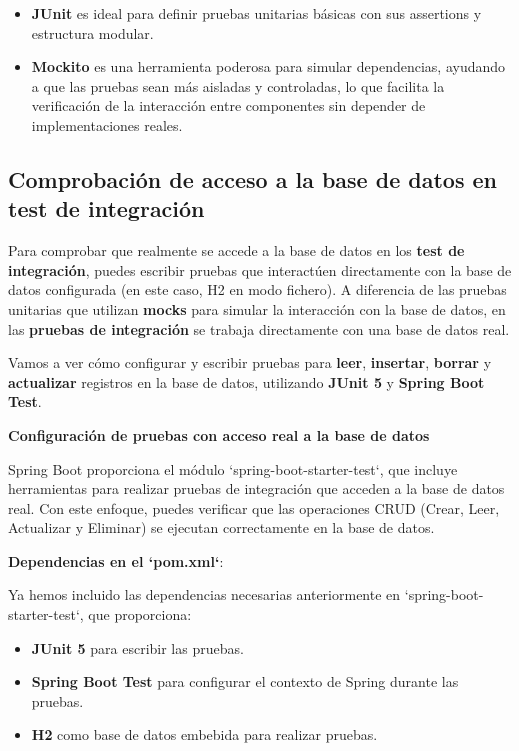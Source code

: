 \documentclass[11pt]{article}
\begin{document}
\begin{itemize}
\item \textbf{\textbf{JUnit}} es ideal para definir pruebas unitarias básicas con sus assertions y estructura modular.
\item \textbf{\textbf{Mockito}} es una herramienta poderosa para simular dependencias, ayudando a que las pruebas sean más aisladas y controladas, lo que facilita la verificación de la interacción entre componentes sin depender de implementaciones reales.
\end{itemize}




\subsection{Comprobación de acceso a la base de datos en test de integración}
\label{sec:orgf8078a7}
Para comprobar que realmente se accede a la base de datos en los \textbf{\textbf{test de integración}}, puedes escribir pruebas que interactúen directamente con la base de datos configurada (en este caso, H2 en modo fichero). A diferencia de las pruebas unitarias que utilizan \textbf{\textbf{mocks}} para simular la interacción con la base de datos, en las \textbf{\textbf{pruebas de integración}} se trabaja directamente con una base de datos real.

Vamos a ver cómo configurar y escribir pruebas para \textbf{\textbf{leer}}, \textbf{\textbf{insertar}}, \textbf{\textbf{borrar}} y \textbf{\textbf{actualizar}} registros en la base de datos, utilizando \textbf{\textbf{JUnit 5}} y \textbf{\textbf{Spring Boot Test}}.

\textbf{\textbf{Configuración de pruebas con acceso real a la base de datos}}

Spring Boot proporciona el módulo `spring-boot-starter-test`, que incluye herramientas para realizar pruebas de integración que acceden a la base de datos real. Con este enfoque, puedes verificar que las operaciones CRUD (Crear, Leer, Actualizar y Eliminar) se ejecutan correctamente en la base de datos.

\textbf{\textbf{Dependencias en el `pom.xml`}}:

Ya hemos incluido las dependencias necesarias anteriormente en `spring-boot-starter-test`, que proporciona:
\begin{itemize}
\item \textbf{\textbf{JUnit 5}} para escribir las pruebas.
\item \textbf{\textbf{Spring Boot Test}} para configurar el contexto de Spring durante las pruebas.
\item \textbf{\textbf{H2}} como base de datos embebida para realizar pruebas.
\end{itemize}
\end{document}
